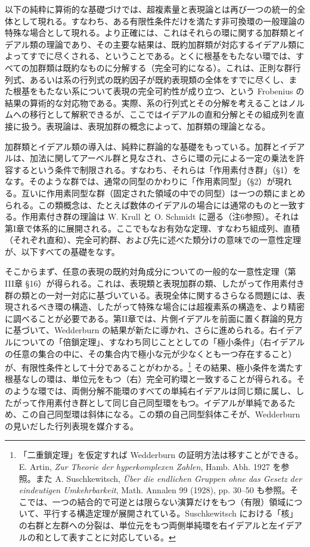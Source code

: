 \documentclass[11pt]{article}
\begin{document}
以下の純粋に算術的な基礎づけでは、超複素量と表現論とは再び一つの統一的全体として現れる。すなわち、ある有限性条件だけを満たす非可換環の一般理論の特殊な場合として現れる。より正確には、これはそれらの環に関する加群類とイデアル類の理論であり、その主要な結果は、既約加群類が対応するイデアル類によってすでに尽くされる、ということである。とくに根基をもたない環では、すべての加群類は既約なものに分解する（完全可約になる）。これは、正則な群行列式、あるいは系の行列式の既約因子が既約表現類の全体をすでに尽くし、また根基をもたない系について表現の完全可約性が成り立つ、という Frobenius の結果の算術的な対応物である。実際、系の行列式とその分解を考えることはノルムへの移行として解釈できるが、ここではイデアルの直和分解とその組成列を直接に扱う。表現論は、表現加群の概念によって、加群類の理論となる。

加群類とイデアル類の導入は、純粋に群論的な基礎をもっている。加群とイデアルは、加法に関してアーベル群と見なされ、さらに環の元による一定の乗法を許容するという条件で制限される。すなわち、それらは「作用素付き群」（§1）をなす。そのような群では、通常の同型のかわりに「作用素同型」（§2）が現れる。互いに作用素同型な群（固定された領域の中での同型）は一つの類にまとめられる。この類概念は、たとえば数体のイデアルの場合には通常のものと一致する。作用素付き群の理論は W. Krull と O. Schmidt に遡る（注6参照）。それは第I章で体系的に展開される。ここでもなお有効な定理、すなわち組成列、直積（それぞれ直和）、完全可約群、および先に述べた類分けの意味での一意性定理が、以下すべての基礎をなす。

そこからまず、任意の表現の既約対角成分についての一般的な一意性定理（第III章 §16）が得られる。これは、表現類と表現加群の類、したがって作用素付き群の類との一対一対応に基づいている。表現全体に関するさらなる問題には、表現されるべき環の構造、したがって特殊な場合には超複素系の構造を、より精密に調べることが必要である。第II章では、片側イデアルを前面に置く群論的見方に基づいて、Wedderburn の結果が新たに導かれ、さらに進められる。右イデアルについての「倍鎖定理」、すなわち同じこととしての「極小条件」（右イデアルの任意の集合の中に、その集合内で極小な元が少なくとも一つ存在すること）が、有限性条件として十分であることがわかる。\footnote{「二重鎖定理」を仮定すれば Wedderburn の証明方法は移すことができる。E. Artin, \emph{Zur Theorie der hyperkomplexen Zahlen}, Hamb. Abh. 1927 を参照。また A. Suschkewitsch, \emph{Über die endlichen Gruppen ohne das Gesetz der eindeutigen Umkehrbarkeit}, Math. Annalen 99 (1928), pp. 30--50 も参照。そこでは、一つの結合的で可逆とは限らない演算だけをもつ（有限）領域について、平行する構造定理が展開されている。Suschkewitsch における「核」の右群と左群への分裂は、単位元をもつ両側単純環を右イデアルと左イデアルの和として表すことに対応している。} その結果、極小条件を満たす根基なしの環は、単位元をもつ（右）完全可約環と一致することが得られる。そのような環では、両側分解不能環のすべての単純右イデアルは同じ類に属し、したがって作用素付き群として同じ自己同型環をもつ。イデアルが単純であるため、この自己同型環は斜体になる。この類の自己同型斜体こそが、Wedderburn の見いだした行列表現を媒介する。
\end{document}
